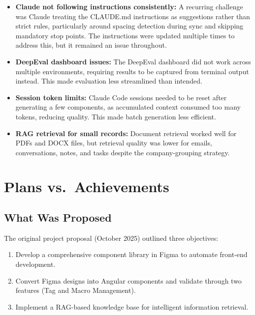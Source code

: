 \begin{itemize}
    \item \textbf{Claude not following instructions consistently:} A recurring challenge was Claude treating the CLAUDE.md instructions as suggestions rather than strict rules, particularly around spacing detection during sync and skipping mandatory stop points. The instructions were updated multiple times to address this, but it remained an issue throughout.
    
    \item \textbf{DeepEval dashboard issues:} The DeepEval dashboard did not work across multiple environments, requiring results to be captured from terminal output instead. This made evaluation less streamlined than intended.
    
    \item \textbf{Session token limits:} Claude Code sessions needed to be reset after generating a few components, as accumulated context consumed too many tokens, reducing quality. This made batch generation less efficient.
    
    \item \textbf{RAG retrieval for small records:} Document retrieval worked well for PDFs and DOCX files, but retrieval quality was lower for emails, conversations, notes, and tasks despite the company-grouping strategy.
\end{itemize}

\section{Plans vs.\ Achievements}

\subsection{What Was Proposed}

The original project proposal (October 2025) outlined three objectives:
\begin{enumerate}
    \item Develop a comprehensive component library in Figma to automate front-end development.
    \item Convert Figma designs into Angular components and validate through two features (Tag and Macro Management).
    \item Implement a RAG-based knowledge base for intelligent information retrieval.
\end{enumerate}

